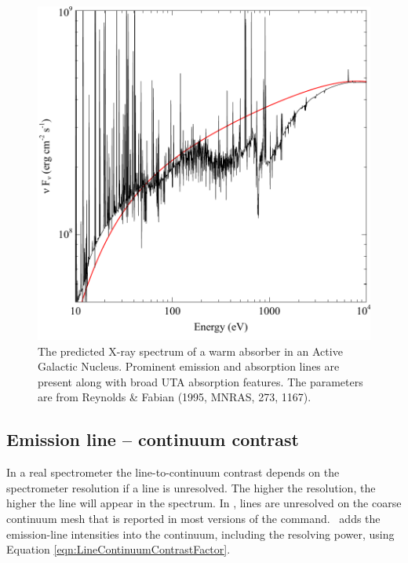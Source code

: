\begin{figure}
\centering
\begin{centering}
\includegraphics[scale=0.9]{WarmAbsorberReynoldsFabian}
\caption[Incident and net emission]{
\label{fig:WarmAbsorberReynoldsFabian}
The predicted X-ray spectrum of a warm absorber 
in an Active Galactic Nucleus. Prominent emission and absorption lines are present along with broad 
UTA absorption features. The parameters are from Reynolds \& Fabian (1995, MNRAS, 273, 1167).}
\end{centering}
\end{figure}

\subsection{Emission line -- continuum contrast}

In a real spectrometer the line-to-continuum contrast
depends on the spectrometer resolution if a line is unresolved.
The higher the resolution, the higher the line will appear in the spectrum.
In \Cloudy, lines are  unresolved on the coarse continuum mesh that is reported
in most versions of the  command.
\Cloudy\ adds the emission-line intensities into the continuum, including the resolving power,
using Equation \ref{eqn:LineContinuumContrastFactor}.


